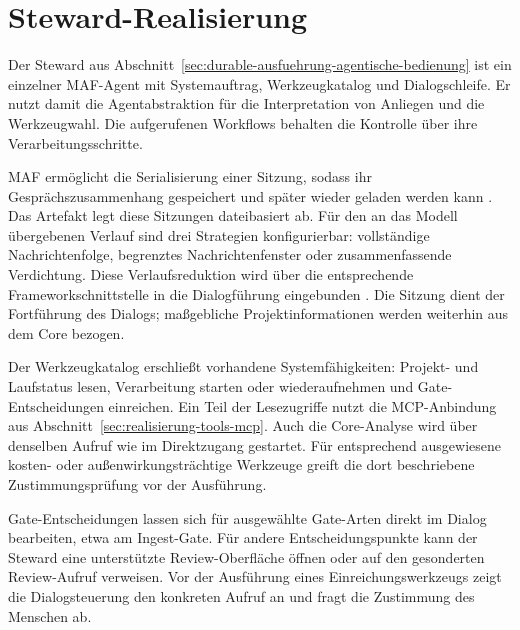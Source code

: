 
\section{Steward-Realisierung}
\label{sec:realisierung-steward}

Der Steward aus
Abschnitt~\ref{sec:durable-ausfuehrung-agentische-bedienung} ist ein
einzelner MAF-Agent mit Systemauftrag, Werkzeugkatalog und
Dialogschleife. Er nutzt damit die Agentabstraktion für die
Interpretation von Anliegen und die Werkzeugwahl. Die aufgerufenen
Workflows behalten die Kontrolle über ihre Verarbeitungsschritte.

MAF ermöglicht die Serialisierung einer Sitzung, sodass ihr
Gesprächszusammenhang gespeichert und später wieder geladen werden
kann \cite{msmaf2026session}.
Das Artefakt legt diese Sitzungen dateibasiert ab. Für den an das
Modell übergebenen Verlauf sind drei Strategien konfigurierbar:
vollständige Nachrichtenfolge, begrenztes Nachrichtenfenster oder
zusammenfassende Verdichtung. Diese Verlaufsreduktion wird über die
entsprechende Frameworkschnittstelle in die Dialogführung eingebunden
\cite{msmaf2026storage}.
Die Sitzung dient der Fortführung des Dialogs; maßgebliche
Projektinformationen werden weiterhin aus dem Core bezogen.

Der Werkzeugkatalog erschließt vorhandene Systemfähigkeiten:
Projekt- und Laufstatus lesen, Verarbeitung starten oder wiederaufnehmen
und Gate-Entscheidungen einreichen. Ein Teil der Lesezugriffe nutzt die
MCP-Anbindung aus Abschnitt~\ref{sec:realisierung-tools-mcp}.
Auch die Core-Analyse wird über denselben Aufruf wie im Direktzugang
gestartet. Für entsprechend ausgewiesene kosten- oder
außenwirkungsträchtige Werkzeuge greift die dort beschriebene
Zustimmungsprüfung vor der Ausführung.

Gate-Entscheidungen lassen sich für ausgewählte Gate-Arten direkt im
Dialog bearbeiten, etwa am Ingest-Gate. Für andere Entscheidungspunkte
kann der Steward eine unterstützte Review-Oberfläche öffnen oder auf
den gesonderten Review-Aufruf verweisen. Vor der Ausführung eines
Einreichungswerkzeugs zeigt die Dialogsteuerung den konkreten Aufruf
an und fragt die Zustimmung des Menschen ab.

